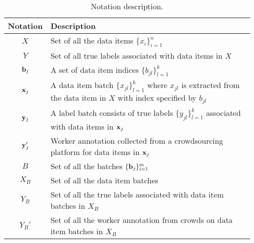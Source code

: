 \begin{table}[!t]
\centering
 {\caption{Notation description.}\label{tab:notation}}
{
  \begin{tabular}{@{}c@{}||p{6.8cm}}
  \hline    
  Notation & Description \\ \hline \hline
  $X$      & Set of all the data items $\{x_i\}_{i=1}^n$  \\ \hline
  $Y$      & Set of all true labels associated with data items in $X$ \\ \hline
  ${\mathbf{b}}_j$    & A set of data item indices $\{b_{jl}\}_{l=1}^{k}$ \\ \hline
  ${\mathbf{x}}_j$    & A data item batch $\{x_{jl}\}_{l=1}^{k}$ where $x_{jl}$ is extracted from the data item in $X$ with index specified by $b_{jl}$ \\ \hline
  ${\mathbf{y}}_j$    & A label batch consists of true labels $\{y_{jl}\}_{l=1}^{k}$ associated with data items in ${\mathbf{x}}_j$ \\ \hline
  ${\mathbf{y}}_j'$   & Worker annotation collected from a crowdsourcing platform for data items in ${\mathbf{x}}_j$ \\ \hline
  $B$      & Set of all the batches $\{{\mathbf{b}}_j\}_{i=1}^m$ \\ \hline
  $X_B$    & Set of all the data item batches \\ \hline
  $Y_B$    & Set of all the true labels associated with data item batches in $X_B$ \\ \hline
  $Y_B'$   & Set of all the worker annotation from crowds on data item batches in $X_B$ \\ \hline
  \end{tabular}
}
\end{table}
